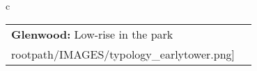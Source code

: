 \begin{table}[H]
        \begin{tabular}{c}
        \begin{tabular}{m{1.5in} m{2in}}
\textbf{Glenwood:} {Low-rise in the park} & \texttt{[image: \\rootpath/IMAGES/typology\_earlytower.png]}
\end{tabular}\end{tabular}
        \end{table}